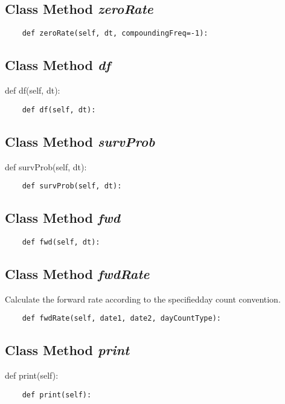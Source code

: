 \documentclass[twoside,11pt]{book}
\begin{document}
\subsection{Class Method {\it zeroRate}}


\begin{lstlisting}
    def zeroRate(self, dt, compoundingFreq=-1):
\end{lstlisting}

\subsection{Class Method {\it df}}
def df(self, dt):

\begin{lstlisting}
    def df(self, dt):
\end{lstlisting}

\subsection{Class Method {\it survProb}}
def survProb(self, dt):

\begin{lstlisting}
    def survProb(self, dt):
\end{lstlisting}

\subsection{Class Method {\it fwd}}


\begin{lstlisting}
    def fwd(self, dt):
\end{lstlisting}

\subsection{Class Method {\it fwdRate}}
Calculate the forward rate according to the specifiedday count convention. 

\begin{lstlisting}
    def fwdRate(self, date1, date2, dayCountType):
\end{lstlisting}

\subsection{Class Method {\it print}}
def print(self):

\begin{lstlisting}
    def print(self):
\end{lstlisting}
\end{document}
